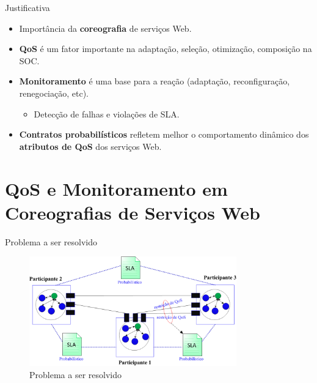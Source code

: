 \documentclass[xcolor=svgnames]{beamer}
\begin{document}
    \begin{frame}{Justificativa}
    	\begin{itemize}
          \item <1->Importância da \textbf{coreografia} de serviços Web.
          \item <2->\textbf{QoS} é um fator importante na adaptação, seleção, otimização, composição na SOC. %
          \item <3->\textbf{Monitoramento} é uma base para a reação (adaptação, reconfiguração, renegociação, etc).
              	\begin{itemize}
                  \item Detecção de falhas e violações de SLA. %
                \end{itemize}
          \item <4->\textbf{Contratos probabilísticos} refletem melhor o comportamento dinâmico dos \textbf{atributos de QoS} dos serviços Web.
    	\end{itemize}
    \end{frame}





\section{QoS e Monitoramento em Coreografias de Serviços Web }

    \begin{frame}{Problema a ser resolvido}
      \begin{figure}[!h]
	  \centering
	  \includegraphics[width=0.8\textwidth]{ChoreographySLAs.png}
	  \caption{Problema a ser resolvido}
      \end{figure}	
    \end{frame}
\end{document}
